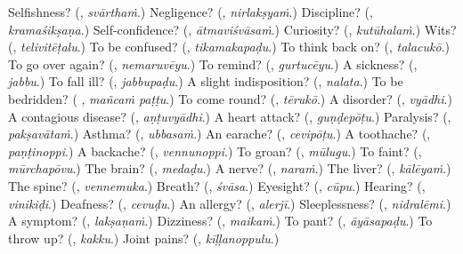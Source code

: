 \begin{tcolorbox}[breakable,colback=teal!4,colframe=teal!35!black,title={Before you move on}]
Selfishness? (\textbf{}, \emph{svārthaṁ}.) Negligence? (\textbf{}, \emph{nirlakṣyaṁ}.) Discipline? (\textbf{}, \emph{kramaśikṣaṇa}.) Self-confidence? (\textbf{}, \emph{ātmaviśvāsaṁ}.) Curiosity? (\textbf{}, \emph{kutūhalaṁ}.) Wits? (\textbf{}, \emph{telivitēṭalu}.) To be confused? (\textbf{}, \emph{tikamakapaḍu}.) To think back on? (\textbf{}, \emph{talacukō}.) To go over again? (\textbf{}, \emph{nemaruvēyu}.) To remind? (\textbf{}, \emph{gurtucēyu}.) A sickness? (\textbf{}, \emph{jabbu}.) To fall ill? (\textbf{}, \emph{jabbupaḍu}.) A slight indisposition? (\textbf{}, \emph{nalata}.) To be bedridden? (\textbf{ }, \emph{mañcaṁ paṭṭu}.) To come round? (\textbf{}, \emph{tērukō}.) A disorder? (\textbf{}, \emph{vyādhi}.) A contagious disease? (\textbf{}, \emph{aṇṭuvyādhi}.) A heart attack? (\textbf{}, \emph{guṇḍepōṭu}.) Paralysis? (\textbf{}, \emph{pakṣavātaṁ}.) Asthma? (\textbf{}, \emph{ubbasaṁ}.) An earache? (\textbf{}, \emph{cevipōṭu}.) A toothache? (\textbf{}, \emph{paṇṭinoppi}.) A backache? (\textbf{}, \emph{vennunoppi}.) To groan? (\textbf{}, \emph{mūlugu}.) To faint? (\textbf{}, \emph{mūrchapōvu}.) The brain? (\textbf{}, \emph{medaḍu}.) A nerve? (\textbf{}, \emph{naraṁ}.) The liver? (\textbf{}, \emph{kālēyaṁ}.) The spine? (\textbf{}, \emph{vennemuka}.) Breath? (\textbf{}, \emph{śvāsa}.) Eyesight? (\textbf{}, \emph{cūpu}.) Hearing? (\textbf{}, \emph{vinikiḍi}.) Deafness? (\textbf{}, \emph{cevuḍu}.) An allergy? (\textbf{}, \emph{alerjī}.) Sleeplessness? (\textbf{}, \emph{nidralēmi}.) A symptom? (\textbf{}, \emph{lakṣaṇaṁ}.) Dizziness? (\textbf{}, \emph{maikaṁ}.) To pant? (\textbf{}, \emph{āyāsapaḍu}.) To throw up? (\textbf{}, \emph{kakku}.) Joint pains? (\textbf{}, \emph{kīḷḷanoppulu}.)
\end{tcolorbox}
